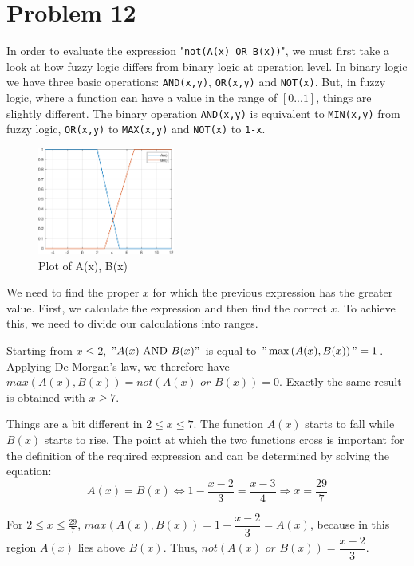 \section{Problem 12}

In order to evaluate the expression "\verb|not(A(x) OR B(x))|", we must first take a look at how fuzzy logic differs from binary logic at operation level.
In binary logic we have three basic operations: \verb*|AND(x,y)|, \verb*|OR(x,y)| and \verb*|NOT(x)|. But, in fuzzy logic, where a function can have a value in the range of $\left[0...1\right]$, things are slightly different.
The binary operation \verb*|AND(x,y)| is equivalent to \verb|MIN(x,y)| from fuzzy logic, \verb*|OR(x,y)| to \verb*|MAX(x,y)| and \verb*|NOT(x)| to \verb|1-x|.

\begin{figure}
	\centering
	\includegraphics[width=0.4\textwidth]{../Problem 12/a_b_functions.pdf}
	\caption{Plot of A(x), B(x)}
	\label{fig:prob_12_a_b}
\end{figure}

We need to find the proper $x$ for which the previous expression has the greater value. First, we calculate the expression and then find the correct $x$.
To achieve this, we need to divide our calculations into ranges. 

Starting from $x \le 2$, $"A(x) \text{ AND } B(x)"$ is equal to $"\max\left(A(x), B(x)\right)" = 1$. Applying De Morgan's law, we therefore have $\textit{max}\left(A(x), B(x)\right) = \textit{not}\left(A(x) \textit{ or } B(x)\right) = 0$.
Exactly the same result is obtained with $x \ge 7$.

Things are a bit different in $2 \le x \le 7$. The function $A(x)$ starts to fall while $B(x)$ starts to rise. The point at which the two functions cross is important for the definition of the required expression and can be determined by solving the equation:
\[
A(x) = B(x) \Leftrightarrow 1 - \frac{x-2}{3} = \frac{x-3}{4} \Rightarrow x = \frac{29}{7}
\]

For $2 \le x \le \frac{29}{7}$, $\textit{max}\left(A(x), B(x)\right) = 1 - \dfrac{x-2}{3} = A(x)$, because in this region $A(x)$ lies above $B(x)$. Thus, $\textit{not}\left(A(x) \textit{ or } B(x)\right) = \dfrac{x-2}{3}$.

